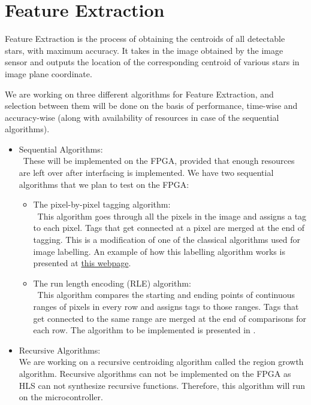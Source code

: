 \documentclass[../../main.tex]{subfiles}
\begin{document}
\section{Feature Extraction}
\thispagestyle{fancy}

Feature Extraction is the process of obtaining the centroids of all detectable stars, with maximum accuracy. It takes in the image obtained by the image sensor and outputs the location of the corresponding centroid of various stars in image plane coordinate.

We are working on three different algorithms for Feature Extraction, and selection between them will be done on the basis of performance, time-wise and accuracy-wise (along with availability of resources in case of the sequential algorithms).
\begin{itemize}
    \item Sequential Algorithms:\\
    \ These will be implemented on the FPGA, provided that enough resources are left over after interfacing is implemented. We have two sequential algorithms that we plan to test on the FPGA:
    \begin{itemize}
        \item The pixel-by-pixel tagging algorithm:\\
        \ This algorithm goes through all the pixels in the image and assigns a tag to each pixel. Tags that get connected at a pixel are merged at the end of tagging. This is a modification of one of the classical algorithms used for image labelling. An example of how this labelling algorithm works is presented at \href{https://aishack.in/tutorials/labelling-connected-components-example/}{this webpage}.
        \item The run length encoding (RLE) algorithm:\\
        \ This algorithm compares the starting and ending points of continuous ranges of pixels in every row and assigns tags to those ranges. Tags that get connected to the same range are merged at the end of comparisons for each row. The algorithm to be implemented is presented in \cite{fe_blob_detection}.
    \end{itemize}
    \item Recursive Algorithms:\\
    We are working on a recursive centroiding algorithm called the region growth algorithm. Recursive algorithms can not be implemented on the FPGA as HLS can not synthesize recursive functions. Therefore, this algorithm will run on the microcontroller.
\end{itemize}
\end{document}
